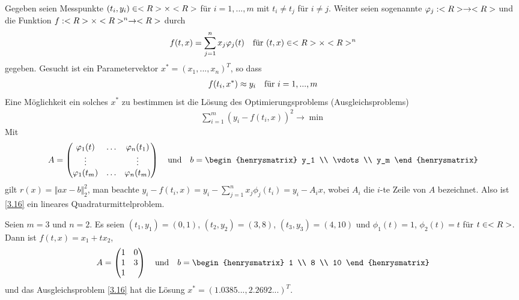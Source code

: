 Gegeben seien Messpunkte $(t_i,y_i)\in<R>\times<R>$ für $i=1,...,m$ mit $t_i\neq t_j$ für $i\neq j$. Weiter seien sogenannte  $\varphi_j:<R>\to<R>$ und die Funktion $f:<R>\times<R>^n\to<R>$ durch
\begin{align}
	f(t,x) = \sum_{j=1}^{n} x_j\varphi_j(t)\quad\text{für } (t,x)\in<R>\times<R>^n\notag
\end{align}
gegeben. Gesucht ist ein  Parametervektor $x^\ast=(x_1,...,x_n)^T$, so dass
\begin{align}
	f(t_i,x^\ast) \approx y_i\quad\text{für } i=1,...,m\notag
\end{align}
Eine Möglichkeit ein solches $x^\ast$ zu bestimmen ist die Lösung des Optimierungsproblems (Ausgleichsproblems)
\begin{align}
	\label{3.16}
	\sum_{i=1}^{m} (y_i - f(t_i,x))^2\to\min
\end{align}
Mit 
\begin{align}
	A = \begin{pmatrix}
		\phi_1(t) & \dots & \phi_n(t_1) \\
		\vdots && \vdots \\
		\phi_1(t_m) & \dots & \phi_n(t_m)
	\end{pmatrix} \quad\text{und}\quad b= \begin{henrysmatrix}
		y_1 \\ \vdots  \\  y_m
	\end{henrysmatrix}\notag
\end{align}
gilt $r(x)=\Vert ax-b\Vert_2^2$, man beachte $y_i-f(t_i,x)=y_i-\sum_{j=1}^n x_j\phi_j(t_i)=y_i-A_ix$, wobei $A_i$ die $i$-te Zeile von $A$ bezeichnet. Also ist \cref{3.16} ein lineares Quadraturmittelproblem.

\begin{example}[Ausgleichsgerade]
	Seien $m=3$ und $n=2$. Es seien $(t_1,y_1)=(0,1)$, $(t_2,y_2)=(3,8)$, $(t_3,y_3)=(4,10)$ und $\phi_1(t)=1$, $\phi_2(t)=t$ für $t\in<R>$. Dann ist $f(t,x)=x_1+tx_2$, 
	\begin{align}
		A = \begin{pmatrix}
			1 & 0 \\ 1 & 3 \\ 1 & 
		\end{pmatrix}\quad\text{und}\quad b = \begin{henrysmatrix}
			1 \\ 8 \\ 10
		\end{henrysmatrix} \notag
	\end{align}
	und das Ausgleichsproblem \cref{3.16} hat die Lösung $x^\ast=(1.0385..., 2.2692...)^T$.
\end{example}
